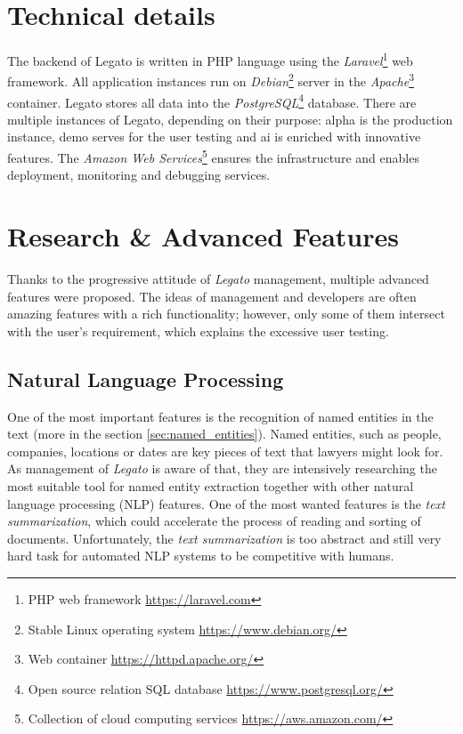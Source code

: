 \documentclass[
  digital, %
  notable,   %
  nolof,     %
  nolot,     %
  draft
]{fithesis3}
\begin{document}
\section{Technical details}
The backend of Legato is written in PHP language using the \textit{Laravel}\footnote{PHP web framework \url{https://laravel.com}} web framework.
All application instances run on \textit{Debian}\footnote{Stable Linux operating system \url{https://www.debian.org/}} server in the \textit{Apache}\footnote{Web container \url{https://httpd.apache.org/}} container.
Legato stores all data into the \textit{PostgreSQL}\footnote{Open source relation SQL database \url{https://www.postgresql.org/}} database.
There are multiple instances of Legato, depending on their purpose: alpha is the production instance, demo serves for the user testing and ai is enriched with innovative features.
The \textit{Amazon Web Services}\footnote{Collection of cloud computing services \url{https://aws.amazon.com/}} ensures the infrastructure and enables deployment, monitoring and debugging services.

\section{Research \& Advanced Features}
\label{sec:legato_advanced}
Thanks to the progressive attitude of \textit{Legato} management, multiple advanced features were proposed.
The ideas of management and developers are often amazing features with a rich functionality; however, only some of them intersect with the user's requirement, which explains the excessive user testing.

\subsection*{Natural Language Processing}
One of the most important features is the recognition of named entities in the text (more in the section \ref{sec:named_entities}).
Named entities, such as people, companies, locations or dates are key pieces of text that lawyers might look for.
As management of \textit{Legato} is aware of that, they are intensively researching the most suitable tool for named entity extraction together with other natural language processing (NLP) features.
One of the most wanted features is the \textit{text summarization}, which could accelerate the process of reading and sorting of documents.
Unfortunately, the \textit{text summarization} is too abstract and still very hard task for automated NLP systems to be competitive with humans.
\end{document}
